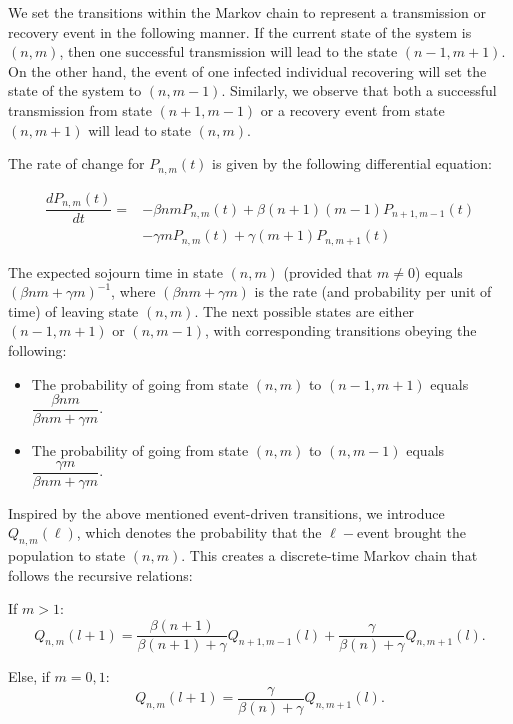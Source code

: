 \documentclass[a4paper]{article}
\theoremstyle{remark}
\begin{document}
We set the transitions within the Markov chain to represent a transmission or recovery event in the following manner. If the current state of the system is $(n,m)$, then one successful transmission will lead to the state $(n-1,m+1)$. On the other hand, the event of one infected individual recovering will set the state of the system to $(n,m-1)$. Similarly, we observe that both a successful transmission from state $(n+1,m-1)$ or a recovery event from state $(n,m+1)$ will lead to state $(n,m)$.

The rate of change for $P_{n,m}(t)$ is given by the following differential equation:


\begin{equation} 
\label{eq:SIR}
\begin{split}
 \dfrac{dP_{n,m}(t)}{dt}=&-\beta nm P_{n,m}(t)+\beta (n+1)(m-1)P_{n+1,m-1}(t)\\
 &-\gamma m P_{n,m}(t) +\gamma (m+1) P_{n,m+1}(t)
 \end{split}
\end{equation}

The expected sojourn time in state $(n,m)$ (provided that $m\neq 0$) equals $(\beta nm +\gamma m)^{-1}$, where $(\beta nm +\gamma m)$ is the rate (and probability per unit of time) of leaving state $(n,m)$. The next possible states are either $(n-1,m+1)$ or $(n,m-1)$, with corresponding transitions obeying the following:
\medskip
\begin{itemize}
    \item The probability of going from state $(n,m)$ to $(n-1,m+1)$ equals $\dfrac{\beta n m}{\beta n m + \gamma m}$.
    \item The probability of going from state $(n,m)$ to $(n,m-1)$ equals $\dfrac{\gamma m}{\beta n m + \gamma m}$.
\end{itemize}

\medskip
Inspired by the above mentioned event-driven transitions, we introduce $Q_{n,m}(\ell)$, which denotes the probability that the $\ell-$event brought the population to state $(n,m)$. This creates a discrete-time Markov chain that follows the recursive relations:

If $m>1$:
\[Q_{n,m}(l+1)=\dfrac{\beta (n+1)}{\beta (n+1) +\gamma}Q_{n+1,m-1}(l)+\dfrac{\gamma}{\beta (n) +\gamma}Q_{n,m+1}(l).\]

Else, if $m=0,1$:
\[Q_{n,m}(l+1)=\dfrac{\gamma}{\beta (n) +\gamma}Q_{n,m+1}(l).\]
\end{document}
